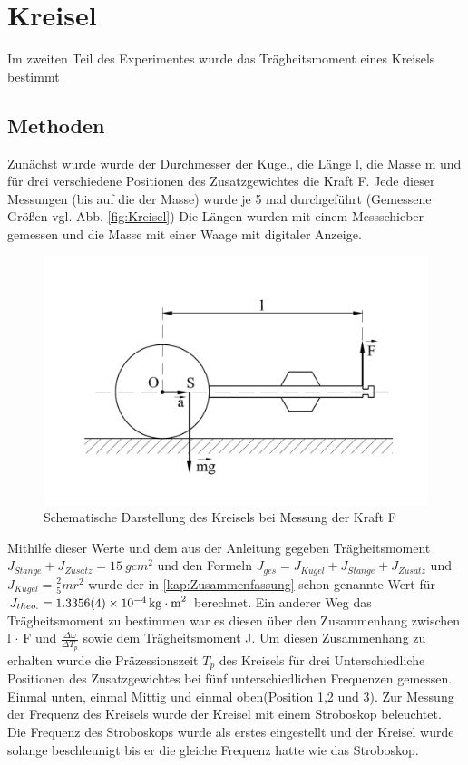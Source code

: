 \section{Kreisel}
Im zweiten Teil des Experimentes wurde das Trägheitsmoment eines Kreisels bestimmt
\subsection{Methoden}\label{kap:KreiselMethoden}
Zunächst wurde wurde der Durchmesser der Kugel, die Länge l, die Masse m und für drei verschiedene Positionen des Zusatzgewichtes die Kraft F.
Jede dieser Messungen (bis auf die der Masse) wurde je 5 mal durchgeführt (Gemessene Größen vgl. Abb. \ref{fig:Kreisel})
Die Längen  wurden mit einem Messschieber gemessen und die Masse mit einer Waage mit digitaler Anzeige.
\begin{figure}[h]
	\centering
	\includegraphics[width=0.7\linewidth]{res/KreiselAufbau.pdf}
	\caption{Schematische Darstellung des Kreisels bei Messung der Kraft F\cite{lw}}
	\label{fig:kreisel}
\end{figure}
Mithilfe dieser Werte und dem aus der Anleitung gegeben Trägheitsmoment $J_{Stange}+J_{Zusatz}=\SI{15}{g cm^2}$ und den Formeln $J_{ges}=J_{Kugel}+J_{Stange}+J_{Zusatz}$ und $J_{Kugel}=\frac{2}{5}mr^2$ wurde der in \cref{kap:Zusammenfassung} schon genannte Wert für $J_{theo.}=\SI{1,3356+-0,0004e-4}{kg \cdot m^2}$ berechnet. Ein anderer Weg das Trägheitsmoment zu bestimmen war es diesen über den Zusammenhang zwischen l $\cdot$ F und  $\frac{\Delta \omega}{\Delta T_p}$ sowie dem Trägheitsmoment J. Um diesen Zusammenhang zu erhalten wurde die Präzessionszeit $T_p$ des Kreisels für drei Unterschiedliche Positionen des Zusatzgewichtes bei fünf unterschiedlichen Frequenzen gemessen. Einmal unten, einmal Mittig und einmal oben(Position 1,2 und 3). Zur Messung der Frequenz des Kreisels wurde der Kreisel mit einem Stroboskop beleuchtet. Die Frequenz des Stroboskops wurde als erstes eingestellt und der Kreisel wurde solange beschleunigt bis er die gleiche Frequenz hatte wie das Stroboskop.

